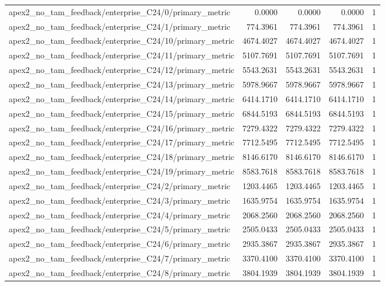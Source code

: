 \begin{table}[h]
\begin{tabular}{lrrrr}
apex2_no_tam_feedback/enterprise_C24/0/primary_metric & 0.0000 & 0.0000 & 0.0000 & 1 \\
apex2_no_tam_feedback/enterprise_C24/1/primary_metric & 774.3961 & 774.3961 & 774.3961 & 1 \\
apex2_no_tam_feedback/enterprise_C24/10/primary_metric & 4674.4027 & 4674.4027 & 4674.4027 & 1 \\
apex2_no_tam_feedback/enterprise_C24/11/primary_metric & 5107.7691 & 5107.7691 & 5107.7691 & 1 \\
apex2_no_tam_feedback/enterprise_C24/12/primary_metric & 5543.2631 & 5543.2631 & 5543.2631 & 1 \\
apex2_no_tam_feedback/enterprise_C24/13/primary_metric & 5978.9667 & 5978.9667 & 5978.9667 & 1 \\
apex2_no_tam_feedback/enterprise_C24/14/primary_metric & 6414.1710 & 6414.1710 & 6414.1710 & 1 \\
apex2_no_tam_feedback/enterprise_C24/15/primary_metric & 6844.5193 & 6844.5193 & 6844.5193 & 1 \\
apex2_no_tam_feedback/enterprise_C24/16/primary_metric & 7279.4322 & 7279.4322 & 7279.4322 & 1 \\
apex2_no_tam_feedback/enterprise_C24/17/primary_metric & 7712.5495 & 7712.5495 & 7712.5495 & 1 \\
apex2_no_tam_feedback/enterprise_C24/18/primary_metric & 8146.6170 & 8146.6170 & 8146.6170 & 1 \\
apex2_no_tam_feedback/enterprise_C24/19/primary_metric & 8583.7618 & 8583.7618 & 8583.7618 & 1 \\
apex2_no_tam_feedback/enterprise_C24/2/primary_metric & 1203.4465 & 1203.4465 & 1203.4465 & 1 \\
apex2_no_tam_feedback/enterprise_C24/3/primary_metric & 1635.9754 & 1635.9754 & 1635.9754 & 1 \\
apex2_no_tam_feedback/enterprise_C24/4/primary_metric & 2068.2560 & 2068.2560 & 2068.2560 & 1 \\
apex2_no_tam_feedback/enterprise_C24/5/primary_metric & 2505.0433 & 2505.0433 & 2505.0433 & 1 \\
apex2_no_tam_feedback/enterprise_C24/6/primary_metric & 2935.3867 & 2935.3867 & 2935.3867 & 1 \\
apex2_no_tam_feedback/enterprise_C24/7/primary_metric & 3370.4100 & 3370.4100 & 3370.4100 & 1 \\
apex2_no_tam_feedback/enterprise_C24/8/primary_metric & 3804.1939 & 3804.1939 & 3804.1939 & 1 \\

\end{tabular}
\end{table}
